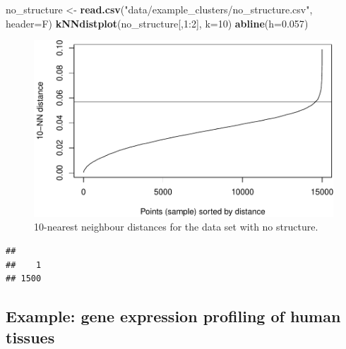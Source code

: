 \documentclass[]{book}
\newenvironment{Shaded}{\begin{snugshade}}{\end{snugshade}}
\newcommand{\KeywordTok}[1]{\textcolor[rgb]{0.13,0.29,0.53}{\textbf{{#1}}}}
\newcommand{\DataTypeTok}[1]{\textcolor[rgb]{0.13,0.29,0.53}{{#1}}}
\newcommand{\DecValTok}[1]{\textcolor[rgb]{0.00,0.00,0.81}{{#1}}}
\newcommand{\FloatTok}[1]{\textcolor[rgb]{0.00,0.00,0.81}{{#1}}}
\newcommand{\StringTok}[1]{\textcolor[rgb]{0.31,0.60,0.02}{{#1}}}
\newcommand{\NormalTok}[1]{{#1}}
\theoremstyle{definition}
\theoremstyle{definition}
\theoremstyle{definition}
\theoremstyle{remark}
\begin{document}
\begin{Shaded}
\begin{Highlighting}[]
\NormalTok{no_structure <-}\StringTok{ }\KeywordTok{read.csv}\NormalTok{(}\StringTok{"data/example_clusters/no_structure.csv"}\NormalTok{, }\DataTypeTok{header=}\NormalTok{F)}
\KeywordTok{kNNdistplot}\NormalTok{(no_structure[,}\DecValTok{1}\NormalTok{:}\DecValTok{2}\NormalTok{], }\DataTypeTok{k=}\DecValTok{10}\NormalTok{)}
\KeywordTok{abline}\NormalTok{(}\DataTypeTok{h=}\FloatTok{0.057}\NormalTok{)}
\end{Highlighting}
\end{Shaded}

\begin{figure}

{\centering \includegraphics[width=0.75\linewidth]{09-clustering_files/figure-latex/noStructureKNNdist-1} 

}

\caption{10-nearest neighbour distances for the data set with no structure.}\label{fig:noStructureKNNdist}
\end{figure}

\begin{Shaded}
\end{Shaded}

\begin{verbatim}
## 
##    1 
## 1500
\end{verbatim}

\subsection{Example: gene expression profiling of human
tissues}\label{example-gene-expression-profiling-of-human-tissues-2}
\end{document}
